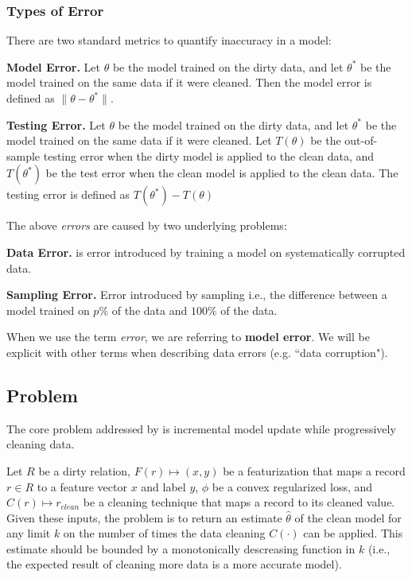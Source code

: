 \subsubsection{Types of Error}
There are two standard metrics to quantify inaccuracy in a model:

\vspace{0.25em}

\noindent\textbf{Model Error. } Let $\theta$ be the model trained on the dirty data, and let $\theta^*$ be the model trained on the same data if it were cleaned. Then the model error is defined as $\|\theta - \theta^*\|$.

\vspace{0.25em}

\noindent\textbf{Testing Error. } Let $\theta$ be the model trained on the dirty data, and let $\theta^*$ be the model trained on the same data if it were cleaned. Let $T(\theta)$ be the out-of-sample testing error when the dirty model is applied to the clean data, and $T(\theta^*)$ be the test error when the clean model is applied to the clean data. The testing error is defined as $T(\theta^*) - T(\theta)$

\vspace{0.5em}

\noindent The above \emph{errors} are caused by two underlying problems:

\vspace{0.25em}

\noindent\textbf{Data Error. } is error introduced by training a model on systematically corrupted data.

\vspace{0.25em}

\noindent\textbf{Sampling Error. } Error introduced by sampling i.e., the difference between a model trained on $p\%$ of the data and $100\%$ of the data.

\vspace{0.25em}

When we use the term \emph{error}, we are referring to \textbf{model error}.
We will be explicit with other terms when describing data errors (e.g. ``data corruption").

\subsection{\sys Problem}
The core problem addressed by \sys is incremental model update while progressively cleaning data.

\begin{problem}\label{activeclean}\sloppy
Let $R$ be a dirty relation, $F(r) \mapsto (x,y)$ be a featurization that maps
a record $r \in R$ to a feature vector $x$ and label $y$, $\phi$ be a convex regularized loss,
and $C(r) \mapsto r_{clean}$ be a cleaning technique that maps a record to its cleaned value. 
Given these inputs, the \sys problem is to return an estimate $\hat{\theta}$ of the clean model for any limit $k$ on the number of times the data cleaning $C(\cdot)$ can be applied.
This estimate should be bounded by a monotonically descreasing function in $k$ (i.e., the expected result of cleaning more data is a more accurate model).
\end{problem}

